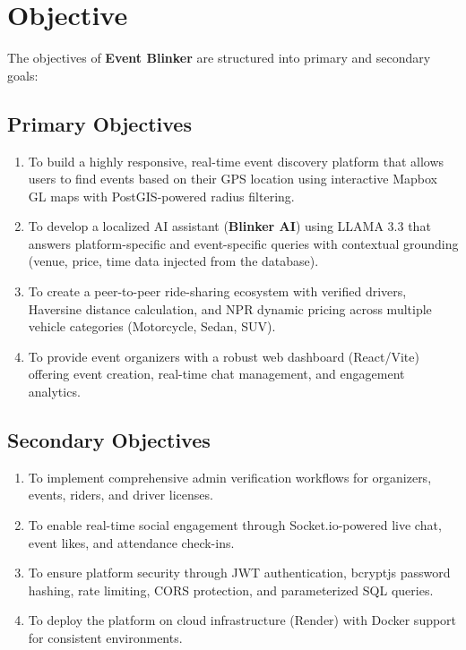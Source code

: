 \chapter{Objective}

The objectives of \textbf{Event Blinker} are structured into primary and secondary goals:

\section{Primary Objectives}
\begin{enumerate}
    \item To build a highly responsive, real-time event discovery platform that allows users to find events based on their GPS location using interactive Mapbox GL maps with PostGIS-powered radius filtering.
    \item To develop a localized AI assistant (\textbf{Blinker AI}) using LLAMA 3.3 that answers platform-specific and event-specific queries with contextual grounding (venue, price, time data injected from the database).
    \item To create a peer-to-peer ride-sharing ecosystem with verified drivers, Haversine distance calculation, and NPR dynamic pricing across multiple vehicle categories (Motorcycle, Sedan, SUV).
    \item To provide event organizers with a robust web dashboard (React/Vite) offering event creation, real-time chat management, and engagement analytics.
\end{enumerate}

\section{Secondary Objectives}
\begin{enumerate}
    \item To implement comprehensive admin verification workflows for organizers, events, riders, and driver licenses.
    \item To enable real-time social engagement through Socket.io-powered live chat, event likes, and attendance check-ins.
    \item To ensure platform security through JWT authentication, bcryptjs password hashing, rate limiting, CORS protection, and parameterized SQL queries.
    \item To deploy the platform on cloud infrastructure (Render) with Docker support for consistent environments.
\end{enumerate}